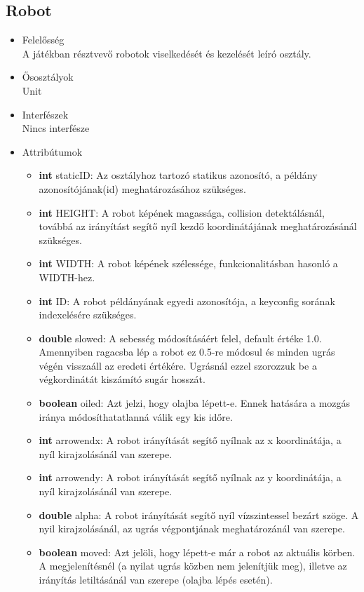 \subsection{Robot}
\begin{itemize}
\item Felelősség\\
A játékban résztvevő robotok viselkedését és kezelését leíró osztály.
\item Ősosztályok\\
Unit
\item Interfészek\\
Nincs interfésze
\item Attribútumok
	\begin{itemize}
		\item \textbf{int} staticID: Az osztályhoz tartozó statikus azonosító, a példány                azonosítójának(id) meghatározásához szükséges.
		\item \textbf{int} HEIGHT: A robot képének magassága, collision                      detektálásnál, továbbá az irányítást segítő nyíl kezdő koordinátájának                  meghatározásánál szükséges.
		\item \textbf{int} WIDTH: A robot képének szélessége, funkcionalitásban hasonló a WIDTH-hez.
		\item \textbf{int} ID: A robot példányának egyedi azonosítója, a keyconfig sorának                     indexelésére szükséges.
		\item \textbf{double} slowed: A sebesség módosításáért felel, default értéke 1.0. Amennyiben ragacsba lép a robot ez 0.5-re módosul és minden ugrás végén visszaáll az eredeti értékére. Ugrásnál ezzel szorozzuk be a végkordinátát kiszámító sugár hosszát.
		\item \textbf{boolean} oiled: Azt jelzi, hogy olajba lépett-e. Ennek hatására a mozgás iránya módosíthatatlanná válik egy kis időre. 
		\item \textbf{int} arrowendx: A robot irányítását segítő nyílnak az x koordinátája, a nyíl kirajzolásánál van szerepe.
		\item \textbf{int} arrowendy: A robot irányítását segítő nyílnak az y koordinátája, a nyíl kirajzolásánál van szerepe.
		\item \textbf{double} alpha: A robot irányítását segítő nyíl vízszintessel bezárt szöge. A nyil kirajzolásánál, az ugrás végpontjának meghatározánál van szerepe.
		\item \textbf{boolean} moved: Azt jelöli, hogy lépett-e már a robot az aktuális körben. A megjelenítésnél (a nyilat ugrás közben nem jelenítjük meg), illetve az irányítás letiltásánál van szerepe (olajba lépés esetén).

\end{itemize}
\end{itemize}
